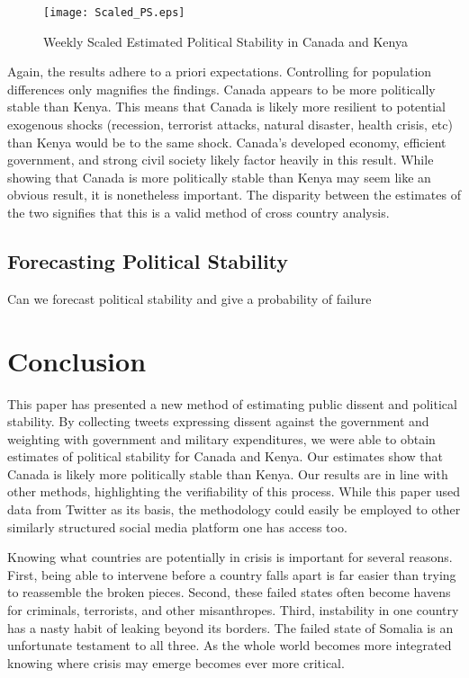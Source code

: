 \documentclass[12pt]{article}
\begin{document}
\begin{spacing}{1.5}
\begin{figure}[htb]
\centering 
\texttt{[image: Scaled\_PS.eps]} 
\caption{Weekly Scaled Estimated Political Stability in Canada and Kenya}
\end{figure}

Again, the results adhere to a priori expectations. Controlling for population differences only magnifies the findings. Canada appears to be more politically stable than Kenya. This means that Canada is likely more resilient to potential exogenous shocks (recession, terrorist attacks, natural disaster, health crisis, etc) than Kenya would be to the same shock. Canada's developed economy, efficient government, and strong civil society likely factor heavily in this result. While showing that Canada is more politically stable than Kenya may seem like an obvious result, it is nonetheless important. The disparity between the estimates of the two signifies that this is a valid method of cross country analysis.


\subsection*{Forecasting Political Stability}

Can we forecast political stability and give a probability of failure 


\section*{Conclusion}

This paper has presented a new method of estimating public dissent and political stability. By collecting tweets expressing dissent against the government and weighting with government and military expenditures, we were able to obtain estimates of political stability for Canada and Kenya. Our estimates show that Canada is likely more politically stable than Kenya. Our results are in line with other methods, highlighting the verifiability of this process. While this paper used data from Twitter as its basis, the methodology could easily be employed to other similarly structured social media platform one has access too.    


Knowing what countries are potentially in crisis is important for several reasons. First, being able to intervene before a country falls apart is far easier than trying to reassemble the broken pieces. Second, these failed states often become havens for criminals, terrorists, and other misanthropes. Third, instability in one country has a nasty habit of leaking beyond its borders. The failed state of Somalia is an unfortunate testament to all three. As the whole world becomes more integrated knowing where crisis may emerge becomes ever more critical. 


\end{spacing}
\end{document}
